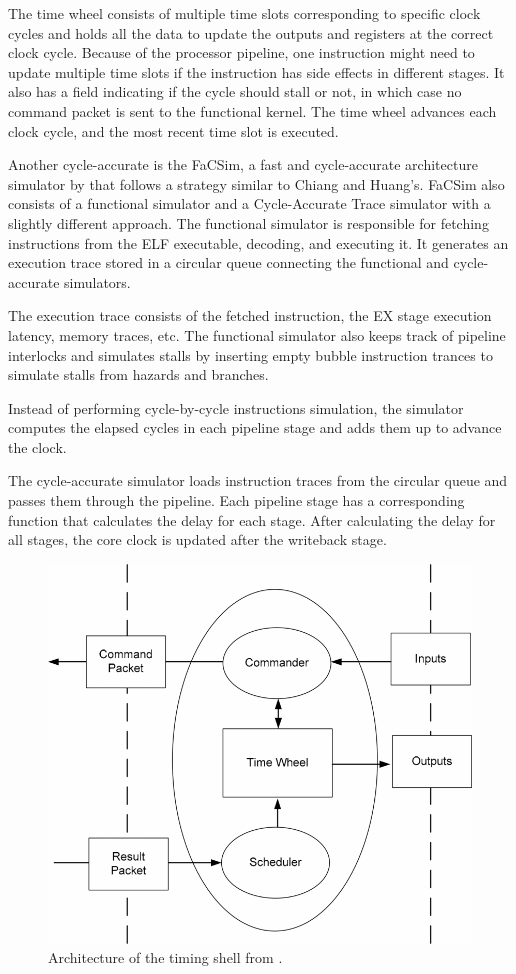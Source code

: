 The time wheel consists of multiple time slots corresponding to specific clock cycles and holds all the data to update the outputs and registers at the correct clock cycle. Because of the processor pipeline, one instruction might need to update multiple time slots if the instruction has side effects in different stages. It also has a field indicating if the cycle should stall or not, in which case no command packet is sent to the functional kernel. The time wheel advances each clock cycle, and the most recent time slot is executed.

Another cycle-accurate is the FaCSim, a fast and cycle-accurate architecture simulator by \textcite{leeFaCSimFastCycleAccurate2008} that follows a strategy similar to Chiang and Huang's. FaCSim also consists of a functional simulator and a Cycle-Accurate Trace simulator with a slightly different approach. The functional simulator is responsible for fetching instructions from the ELF executable, decoding, and executing it. It generates an execution trace stored in a circular queue connecting the functional and cycle-accurate simulators. 

The execution trace consists of the fetched instruction, the EX stage execution latency, memory traces, etc. The functional simulator also keeps track of pipeline interlocks and simulates stalls by inserting empty bubble instruction trances to simulate stalls from hazards and branches.

Instead of performing cycle-by-cycle instructions simulation, the simulator computes the elapsed cycles in each pipeline stage and adds them up to advance the clock. 

The cycle-accurate simulator loads instruction traces from the circular queue and passes them through the pipeline. Each pipeline stage has a corresponding function that calculates the delay for each stage. After calculating the delay for all stages, the core clock is updated after the writeback stage. 

\begin{figure}[htb]
    \centering
    \includegraphics[width=0.5\linewidth]{figures/timeShell.png}
    \caption{Architecture of the timing shell from \cite{chiangEfficientTwolayeredCycleaccurate2009}.}
    \label{fig:timeshell}
\end{figure}

